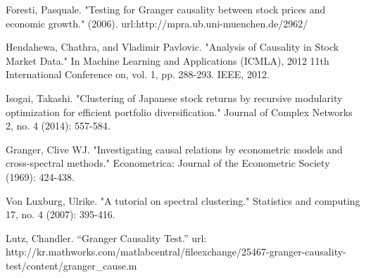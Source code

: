 \documentclass[conference]{IEEEtran}
\begin{document}
%
%
%
\begin{thebibliography}{7}


Foresti, Pasquale. "Testing for Granger causality between stock prices and economic growth." (2006). url:http://mpra.ub.uni-muenchen.de/2962/

Hendahewa, Chathra, and Vladimir Pavlovic. "Analysis of Causality in Stock Market Data." In Machine Learning and Applications (ICMLA), 2012 11th International Conference on, vol. 1, pp. 288-293. IEEE, 2012.

Isogai, Takashi. "Clustering of Japanese stock returns by recursive modularity optimization for efficient portfolio diversification." Journal of Complex Networks 2, no. 4 (2014): 557-584.


Granger, Clive WJ. "Investigating causal relations by econometric models and cross-spectral methods." Econometrica: Journal of the Econometric Society (1969): 424-438.


Von Luxburg, Ulrike. "A tutorial on spectral clustering." Statistics and computing 17, no. 4 (2007): 395-416.

Lutz, Chandler. ``Granger Causality Test.'' url: http://kr.mathworks.com/matlabcentral/fileexchange/25467-granger-causality-test/content/granger\_cause.m


\end{thebibliography}
\end{document}
